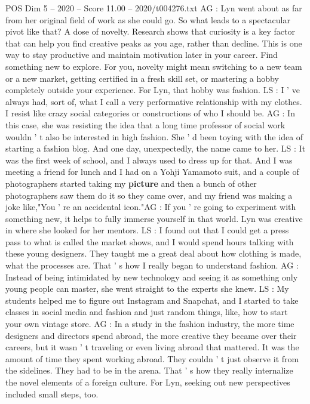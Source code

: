 \begin{textsample}{POS Dim 5 – 2020 – Score 11.00 – 2020/t004276.txt}
AG : Lyn went about as far from her original field of work as she could go.
So what leads to a spectacular pivot like that?
A dose of novelty.
Research shows that curiosity is a key factor that can help you find creative peaks as you age, rather than decline.
This is one way to stay productive and maintain motivation later in your career.
Find something new to explore.
For you, novelty might mean switching to a new team or a new market, getting certified in a fresh skill set, or mastering a hobby completely outside your experience.
For Lyn, that hobby was fashion.
LS : I ' ve always had, sort of, what I call a very performative relationship with my clothes.
I resist like crazy social categories or constructions of who I should be.
AG : In this case, she was resisting the idea that a long time professor of social work wouldn ' t also be interested in high fashion.
She ' d been toying with the idea of starting a fashion blog.
And one day, unexpectedly, the name came to her.
LS : It was the first week of school, and I always used to dress up for that.
And I was meeting a friend for lunch and I had on a Yohji Yamamoto suit, and a couple of photographers started taking my \textbf{picture} and then a bunch of other photographers saw them do it so they came over, and my friend was making a joke like,"You ' re an accidental icon."AG : If you ' re going to experiment with something new, it helps to fully immerse yourself in that world.
Lyn was creative in where she looked for her mentors.
LS : I found out that I could get a press pass to what is called the market shows, and I would spend hours talking with these young designers.
They taught me a great deal about how clothing is made, what the processes are.
That ' s how I really began to understand fashion.
AG : Instead of being intimidated by new technology and seeing it as something only young people can master, she went straight to the experts she knew.
LS : My students helped me to figure out Instagram and Snapchat, and I started to take classes in social media and fashion and just random things, like, how to start your own vintage store.
AG : In a study in the fashion industry, the more time designers and directors spend abroad, the more creative they became over their careers, but it wasn ' t traveling or even living abroad that mattered.
It was the amount of time they spent working abroad.
They couldn ' t just observe it from the sidelines.
They had to be in the arena.
That ' s how they really internalize the novel elements of a foreign culture.
For Lyn, seeking out new perspectives included small steps, too.

\end{textsample}
